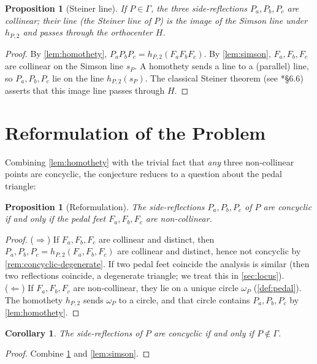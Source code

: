 \documentclass[11pt,a4paper]{article}
\newtheorem{proposition}[theorem]{Proposition}
\newtheorem{corollary}[theorem]{Corollary}
\theoremstyle{definition}
\newcommand{\Pa}{P_{a}}
\newcommand{\Pb}{P_{b}}
\newcommand{\Pc}{P_{c}}
\newcommand{\Fa}{F_{a}}
\newcommand{\Fb}{F_{b}}
\newcommand{\Fc}{F_{c}}
\newcommand{\circc}{\Gamma}
\newcommand{\pedalc}{\omega_{P}}
\begin{document}
\begin{proposition}[Steiner line]\label{prop:steiner}
If $P\in\circc$, the three side-reflections $\Pa,\Pb,\Pc$ are collinear; their line (the \emph{Steiner line} of $P$) is the image of the Simson line under $h_{P,2}$ and passes through the orthocenter $H$.
\end{proposition}
\begin{proof}
By \cref{lem:homothety}, $\Pa\Pb\Pc=h_{P,2}(\Fa\Fb\Fc)$. By \cref{lem:simson}, $\Fa,\Fb,\Fc$ are collinear on the Simson line $s_{P}$. A homothety sends a line to a (parallel) line, so $\Pa,\Pb,\Pc$ lie on the line $h_{P,2}(s_{P})$. The classical Steiner theorem (see \cite{Coxeter}*{\S6.6}) asserts that this image line passes through $H$.
\end{proof}

\section{Reformulation of the Problem}\label{sec:reform}

Combining \cref{lem:homothety} with the trivial fact that \emph{any} three non-collinear points are concyclic, the conjecture reduces to a question about the pedal triangle:

\begin{proposition}[Reformulation]\label{prop:reform}
The side-reflections $\Pa,\Pb,\Pc$ of $P$ are concyclic if and only if the pedal feet $\Fa,\Fb,\Fc$ are non-collinear.
\end{proposition}
\begin{proof}
($\Rightarrow$) If $\Fa,\Fb,\Fc$ are collinear and distinct, then $\Pa,\Pb,\Pc=h_{P,2}(\Fa,\Fb,\Fc)$ are collinear and distinct, hence not concyclic by \cref{rem:concyclic-degenerate}. If two pedal feet coincide the analysis is similar (then two reflections coincide, a degenerate triangle; we treat this in \cref{sec:locus}).\\
($\Leftarrow$) If $\Fa,\Fb,\Fc$ are non-collinear, they lie on a unique circle $\pedalc$ (\cref{def:pedal}). The homothety $h_{P,2}$ sends $\pedalc$ to a circle, and that circle contains $\Pa,\Pb,\Pc$ by \cref{lem:homothety}.
\end{proof}

\begin{corollary}\label{cor:reform-circ}
The side-reflections of $P$ are concyclic if and only if $P\notin\circc$.
\end{corollary}
\begin{proof}
Combine \cref{prop:reform} and \cref{lem:simson}.
\end{proof}
\end{document}
